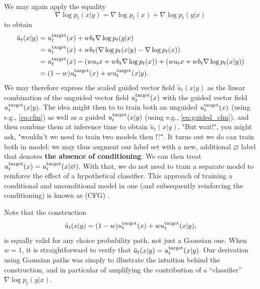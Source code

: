 We may again apply the equality $$\nabla \log p_t(x|y) = \nabla \log p_t(x) + \nabla \log p_t(y|x)$$ to obtain 
\begin{align*}\tilde{u}_t(x|y) &= u^{\text{target}}_t(x) + w b_t \nabla \log p_t(y|x)\\
&= u^{\text{target}}_t(x) + w b_t (\nabla \log p_t(x|y) - \nabla \log p_t(x))\\
&= u^{\text{target}}_t(x) - (w a_tx + w b_t \nabla \log p_t(x)) + (w a_t x + w b_t \nabla \log p_t(x|y))\\
&= (1-w) u^{\text{target}}_t(x) + w u^{\text{target}}_t(x|y).\end{align*}
We may therefore express the scaled guided vector field $\tilde{u}_t(x|y)$ as the linear combination of the unguided vector field $u^{\text{target}}_t(x)$ with the guided vector field $u^{\text{target}}_t(x|y)$. The idea might then to to train both an unguided $u^{\text{target}}_t(x)$ (using e.g., \cref{eq:cfm}) as well as a guided $u^{\text{target}}_t(x|y)$ (using e.g., \cref{eq:guided_cfm}), and then combine them at inference time to obtain $\tilde{u}_t(x|y)$. "But wait!", you might ask, "wouldn't we need to train two models then !?". It turns out we do can train both in model: we may thus augment our label set with a new, additional $\varnothing$ label that denotes \textbf{the absence of conditioning}. We can then treat $u^{\text{target}}_t(x)=u^{\text{target}}_t(x|\varnothing)$. With that, we do not need to train a separate model to reinforce the effect of a hypothetical classifier. This approach of training a conditional and unconditional model in one (and subsequently reinforcing the conditioning) is known as  (CFG) \cite{cfg}. 

\begin{remarkbox}
Note that the construction
\begin{equation*}
    \tilde{u}_t(x|y) = (1-w) u^{\text{target}}_t(x) + w u^{\text{target}}_t(x|y),
\end{equation*}
is equally valid for any choice probability path, not just a Gaussian one. When $w=1$, it is straightforward to verify that $\tilde{u}_t(x|y)=u^{\text{target}}_t(x|y)$. Our derivation using Gaussian paths was simply to illustrate the intuition behind the construction, and in particular of amplifying the contribution of a ``classifier'' $\nabla \log p_t(y|x)$.
\end{remarkbox}

